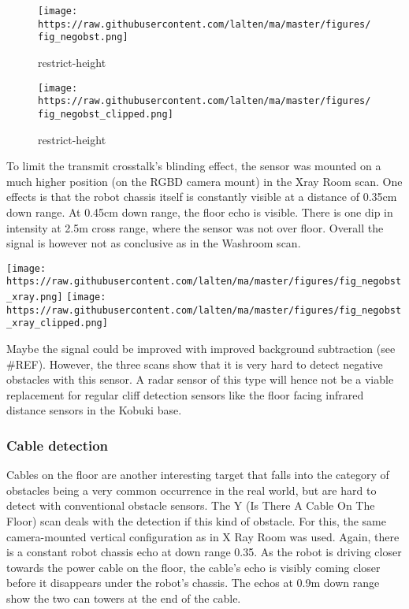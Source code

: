 \begin{figure}
\centering
\texttt{[image: https://raw.githubusercontent.com/lalten/ma/master/figures/fig\_negobst.png]}
\caption{restrict-height}
\end{figure}

\begin{figure}
\centering
\texttt{[image: https://raw.githubusercontent.com/lalten/ma/master/figures/fig\_negobst\_clipped.png]}
\caption{restrict-height}
\end{figure}

To limit the transmit crosstalk's blinding effect, the sensor was
mounted on a much higher position (on the RGBD camera mount) in the Xray
Room scan. One effects is that the robot chassis itself is constantly
visible at a distance of 0.35cm down range. At 0.45cm down range, the
floor echo is visible. There is one dip in intensity at 2.5m cross
range, where the sensor was not over floor. Overall the signal is
however not as conclusive as in the Washroom scan.

\texttt{[image: https://raw.githubusercontent.com/lalten/ma/master/figures/fig\_negobst\_xray.png]}
\texttt{[image: https://raw.githubusercontent.com/lalten/ma/master/figures/fig\_negobst\_xray\_clipped.png]}

Maybe the signal could be improved with improved background subtraction
(see \#REF). However, the three scans show that it is very hard to
detect negative obstacles with this sensor. A radar sensor of this type
will hence not be a viable replacement for regular cliff detection
sensors like the floor facing infrared distance sensors in the Kobuki
base.

\subsubsection{Cable detection}\label{cable-detection}

Cables on the floor are another interesting target that falls into the
category of obstacles being a very common occurrence in the real world,
but are hard to detect with conventional obstacle sensors. The Y (Is
There A Cable On The Floor) scan deals with the detection if this kind
of obstacle. For this, the same camera-mounted vertical configuration as
in X Ray Room was used. Again, there is a constant robot chassis echo at
down range 0.35. As the robot is driving closer towards the power cable
on the floor, the cable's echo is visibly coming closer before it
disappears under the robot's chassis. The echos at 0.9m down range show
the two can towers at the end of the cable.

